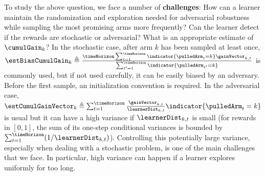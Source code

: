 
To study the above question, we face a number of \textbf{challenges}: 
How can a learner maintain the randomization and
exploration needed for adversarial robustness while
sampling the most promising arms more frequently? 
Can the learner detect
if the rewards are stochastic or adversarial? What is an appropriate estimate 
of $\cumulGain_{k}$? %
In the stochastic case, after arm $k$ has been sampled at least once,
$\estBiasCumulGain_{k} \triangleq
\frac{\timeHorizon\sum_{t=1}^{\timeHorizon}
	\indicator{\pulledArm_{t}=k}\gainVector_{k,t}}{\sum_{t'=1}^{\timeHorizon}\indicator{\pulledArm_{t'}=k}}
$ %
is commonly used, but if not used carefully, it can be easily biased 
by an adversary. Before the first sample, an initialization convention
is required. In the adversarial case,
$\estCumulGainVector_{k} \triangleq \sum_{t=1}^{\timeHorizon}
\frac{\gainVector_{k,t}}
{\learnerDist_{k,t}} \indicator{\pulledArm_{t} = k} $ is usual but it can have a 
high variance if $\learnerDist_{k,t}$ is small (for rewards in $[0,1]$,
the sum of its one-step conditional variances is bounded by
$\sum_{t=1}^{\timeHorizon} (1/ \learnerDist_{k,t})$).  Controlling this
potentially large variance, especially when dealing with a stochastic
problem, is one of the main challenges that we face. In particular,
high variance can happen %
if
a learner explores uniformly for too long.

